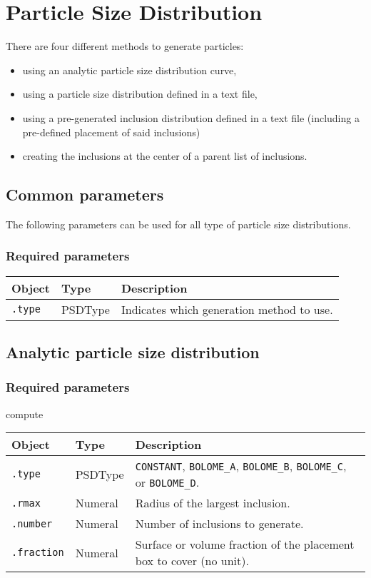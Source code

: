 \documentclass[10pt]{article}
\begin{document}
\section{Particle Size Distribution}

There are four different methods to generate particles:
\begin{itemize}
	\item using an analytic particle size distribution curve,
	\item using a particle size distribution defined in a text file,
	\item using a pre-generated inclusion distribution defined in a text file (including a pre-defined placement of said inclusions)
	\item creating the inclusions at the center of a parent list of inclusions.
\end{itemize}

\subsection{Common parameters}

The following parameters can be used for all type of particle size distributions.

\subsubsection*{Required parameters}

\begin{tabularx}{\textwidth}{llX}
\hline 
Object & Type & Description \\ 
\hline 
\verb+.type+ & PSDType & Indicates which generation method to use. \\ 
\hline 
\end{tabularx}

\subsection{Analytic particle size distribution}

\subsubsection*{Required parameters}
compute
\begin{tabularx}{\textwidth}{llX}
\hline 
Object & Type & Description \\ 
\hline 
\verb+.type+ & PSDType & \verb+CONSTANT+, \verb+BOLOME_A+, \verb+BOLOME_B+, \verb+BOLOME_C+, or \verb+BOLOME_D+. \\ 
\verb+.rmax+ & Numeral & Radius of the largest inclusion. \\ 
\verb+.number+ & Numeral & Number of inclusions to generate. \\ 
\verb+.fraction+ & Numeral & Surface or volume fraction of the placement box to cover (no unit). \\ 
\hline 
\end{tabularx}
\end{document}

